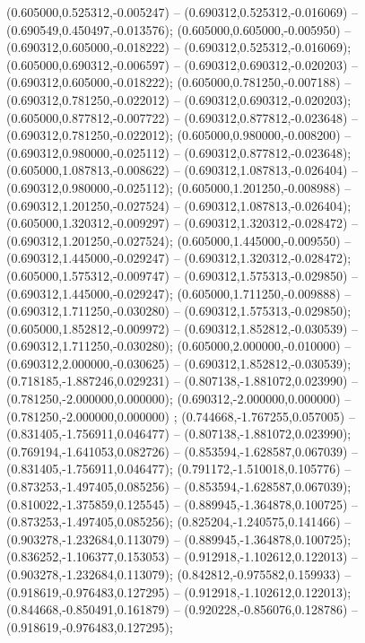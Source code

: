  (0.605000,0.525312,-0.005247) -- (0.690312,0.525312,-0.016069) -- (0.690549,0.450497,-0.013576);
 (0.605000,0.605000,-0.005950) -- (0.690312,0.605000,-0.018222) -- (0.690312,0.525312,-0.016069);
 (0.605000,0.690312,-0.006597) -- (0.690312,0.690312,-0.020203) -- (0.690312,0.605000,-0.018222);
 (0.605000,0.781250,-0.007188) -- (0.690312,0.781250,-0.022012) -- (0.690312,0.690312,-0.020203);
 (0.605000,0.877812,-0.007722) -- (0.690312,0.877812,-0.023648) -- (0.690312,0.781250,-0.022012);
 (0.605000,0.980000,-0.008200) -- (0.690312,0.980000,-0.025112) -- (0.690312,0.877812,-0.023648);
 (0.605000,1.087813,-0.008622) -- (0.690312,1.087813,-0.026404) -- (0.690312,0.980000,-0.025112);
 (0.605000,1.201250,-0.008988) -- (0.690312,1.201250,-0.027524) -- (0.690312,1.087813,-0.026404);
 (0.605000,1.320312,-0.009297) -- (0.690312,1.320312,-0.028472) -- (0.690312,1.201250,-0.027524);
 (0.605000,1.445000,-0.009550) -- (0.690312,1.445000,-0.029247) -- (0.690312,1.320312,-0.028472);
 (0.605000,1.575312,-0.009747) -- (0.690312,1.575313,-0.029850) -- (0.690312,1.445000,-0.029247);
 (0.605000,1.711250,-0.009888) -- (0.690312,1.711250,-0.030280) -- (0.690312,1.575313,-0.029850);
 (0.605000,1.852812,-0.009972) -- (0.690312,1.852812,-0.030539) -- (0.690312,1.711250,-0.030280);
 (0.605000,2.000000,-0.010000) -- (0.690312,2.000000,-0.030625) -- (0.690312,1.852812,-0.030539);
 (0.718185,-1.887246,0.029231) -- (0.807138,-1.881072,0.023990) -- (0.781250,-2.000000,0.000000);
 (0.690312,-2.000000,0.000000) -- (0.781250,-2.000000,0.000000) ;
 (0.744668,-1.767255,0.057005) -- (0.831405,-1.756911,0.046477) -- (0.807138,-1.881072,0.023990);
 (0.769194,-1.641053,0.082726) -- (0.853594,-1.628587,0.067039) -- (0.831405,-1.756911,0.046477);
 (0.791172,-1.510018,0.105776) -- (0.873253,-1.497405,0.085256) -- (0.853594,-1.628587,0.067039);
 (0.810022,-1.375859,0.125545) -- (0.889945,-1.364878,0.100725) -- (0.873253,-1.497405,0.085256);
 (0.825204,-1.240575,0.141466) -- (0.903278,-1.232684,0.113079) -- (0.889945,-1.364878,0.100725);
 (0.836252,-1.106377,0.153053) -- (0.912918,-1.102612,0.122013) -- (0.903278,-1.232684,0.113079);
 (0.842812,-0.975582,0.159933) -- (0.918619,-0.976483,0.127295) -- (0.912918,-1.102612,0.122013);
 (0.844668,-0.850491,0.161879) -- (0.920228,-0.856076,0.128786) -- (0.918619,-0.976483,0.127295);
